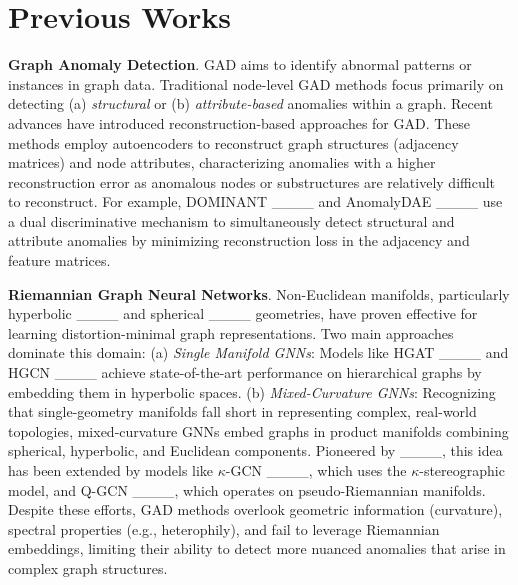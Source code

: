 \section{Previous Works}
\textbf{Graph Anomaly Detection}. GAD aims to identify abnormal patterns or instances in graph data. Traditional node-level GAD methods focus primarily on detecting (a) \textit{structural} or (b) \textit{attribute-based} anomalies within a graph. Recent advances have introduced reconstruction-based approaches for GAD. These methods employ autoencoders to reconstruct graph structures (adjacency matrices) and node attributes, characterizing anomalies with a higher reconstruction error as anomalous nodes or substructures are relatively difficult to reconstruct. For example, DOMINANT ____ and AnomalyDAE ____ use a dual discriminative mechanism to simultaneously detect structural and attribute anomalies by minimizing reconstruction loss in the adjacency and feature matrices. 

\textbf{Riemannian Graph Neural Networks}. Non-Euclidean manifolds, particularly hyperbolic ____ and spherical ____ geometries, have proven effective for learning distortion-minimal graph representations. 
Two main approaches dominate this domain: (a) \textit{Single Manifold GNNs}: Models like HGAT ____ and HGCN ____ achieve state-of-the-art performance on hierarchical graphs by embedding them in hyperbolic spaces. (b) \textit{Mixed-Curvature GNNs}: Recognizing that single-geometry manifolds fall short in representing complex, real-world topologies, mixed-curvature GNNs embed graphs in product manifolds combining spherical, hyperbolic, and Euclidean components. Pioneered by ____, this idea has been extended by models like $\kappa$-GCN ____, which uses the $\kappa$-stereographic model, and Q-GCN ____, which operates on pseudo-Riemannian manifolds. Despite these efforts, GAD methods overlook geometric information (curvature), spectral properties (e.g., heterophily), and fail to leverage Riemannian embeddings, limiting their ability to detect more nuanced anomalies that arise in complex graph structures.
